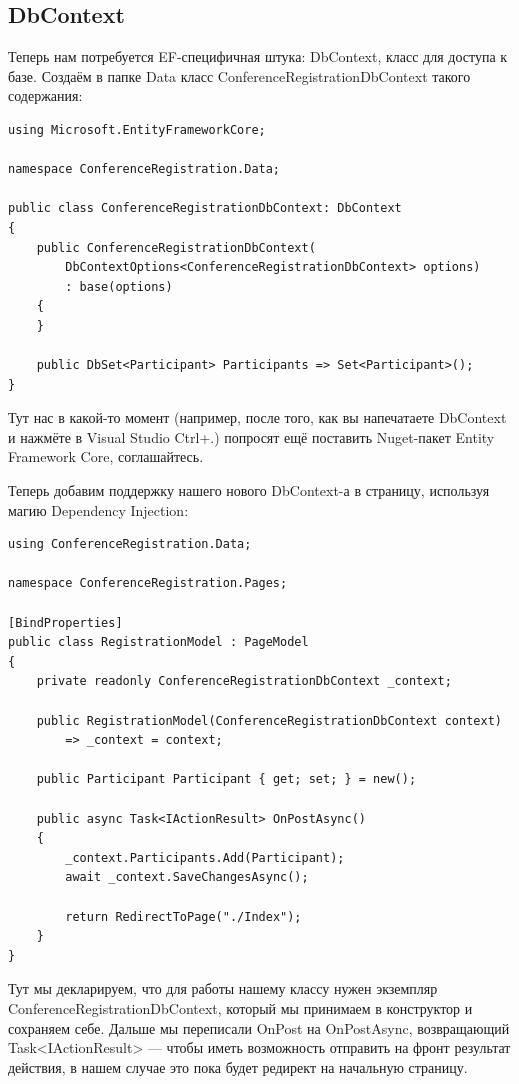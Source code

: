 \documentclass[a5paper]{article}
\begin{document}
\subsection{DbContext}

Теперь нам потребуется EF-специфичная штука: DbContext, класс для доступа к базе. Создаём в папке Data класс ConferenceRegistrationDbContext такого содержания:

\begin{verbatim}
using Microsoft.EntityFrameworkCore;

namespace ConferenceRegistration.Data;

public class ConferenceRegistrationDbContext: DbContext
{
    public ConferenceRegistrationDbContext(
        DbContextOptions<ConferenceRegistrationDbContext> options)
        : base(options)
    {
    }

    public DbSet<Participant> Participants => Set<Participant>();
}
\end{verbatim}

Тут нас в какой-то момент (например, после того, как вы напечатаете DbContext и нажмёте в Visual Studio Ctrl+.) попросят ещё поставить Nuget-пакет Entity Framework Core, соглашайтесь.

Теперь добавим поддержку нашего нового DbContext-а в страницу, используя магию Dependency Injection:

\begin{verbatim}
using ConferenceRegistration.Data;

namespace ConferenceRegistration.Pages;

[BindProperties]
public class RegistrationModel : PageModel
{
    private readonly ConferenceRegistrationDbContext _context;

    public RegistrationModel(ConferenceRegistrationDbContext context)
        => _context = context;

    public Participant Participant { get; set; } = new();

    public async Task<IActionResult> OnPostAsync()
    {
        _context.Participants.Add(Participant);
        await _context.SaveChangesAsync();

        return RedirectToPage("./Index");
    }
}
\end{verbatim}

Тут мы декларируем, что для работы нашему классу нужен экземпляр ConferenceRegistrationDbContext, который мы принимаем в конструктор и сохраняем себе. Дальше мы переписали OnPost на OnPostAsync, возвращающий Task<IActionResult> --- чтобы иметь возможность отправить на фронт результат действия, в нашем случае это пока будет редирект на начальную страницу.
\end{document}

